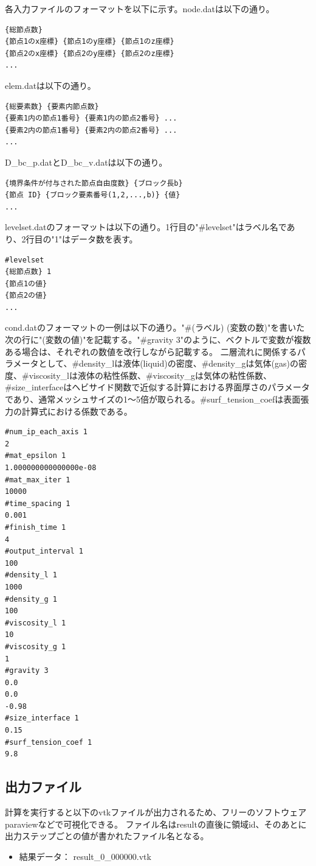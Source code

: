 \documentclass[8pt,a4paper]{article}
\begin{document}
各入力ファイルのフォーマットを以下に示す。node.datは以下の通り。
\begin{lstlisting}[]
{総節点数}
{節点1のx座標} {節点1のy座標} {節点1のz座標}
{節点2のx座標} {節点2のy座標} {節点2のz座標}
...
\end{lstlisting}

elem.datは以下の通り。
\begin{lstlisting}[]
{総要素数} {要素内節点数}
{要素1内の節点1番号} {要素1内の節点2番号} ...
{要素2内の節点1番号} {要素2内の節点2番号} ...
...
\end{lstlisting}

D\_bc\_p.datとD\_bc\_v.datは以下の通り。
\begin{lstlisting}[]
{境界条件が付与された節点自由度数} {ブロック長b}
{節点 ID} {ブロック要素番号(1,2,...,b)} {値}
...
\end{lstlisting}

levelset.datのフォーマットは以下の通り。1行目の"\#levelset"はラベル名であり、2行目の"1"はデータ数を表す。
\begin{lstlisting}[]
#levelset
{総節点数} 1
{節点1の値}
{節点2の値}
...
\end{lstlisting}


cond.datのフォーマットの一例は以下の通り。"\#(ラベル) (変数の数)"を書いた次の行に"(変数の値)"を記載する。"\#gravity 3"のように、ベクトルで変数が複数ある場合は、それぞれの数値を改行しながら記載する。
二層流れに関係するパラメータとして、\#density\_lは液体(liquid)の密度、\#density\_gは気体(gas)の密度、\#viscosity\_lは液体の粘性係数、\#viscosity\_gは気体の粘性係数、\#size\_interfaceはヘビサイド関数で近似する計算における界面厚さのパラメータであり、通常メッシュサイズの1～5倍が取られる。\#surf\_tension\_coefは表面張力の計算式における係数である。
\begin{lstlisting}[]
#num_ip_each_axis 1
2
#mat_epsilon 1
1.000000000000000e-08
#mat_max_iter 1
10000
#time_spacing 1
0.001
#finish_time 1
4
#output_interval 1
100
#density_l 1
1000
#density_g 1
100
#viscosity_l 1
10
#viscosity_g 1
1
#gravity 3
0.0
0.0
-0.98
#size_interface 1
0.15
#surf_tension_coef 1
9.8

\end{lstlisting}

\subsection{出力ファイル}

計算を実行すると以下のvtkファイルが出力されるため、フリーのソフトウェアparaviewなどで可視化できる。
ファイル名はresultの直後に領域id、そのあとに出力ステップごとの値が書かれたファイル名となる。
\begin{itemize}
	\item 結果データ： result\_0\_000000.vtk
\end{itemize}
\end{document}
